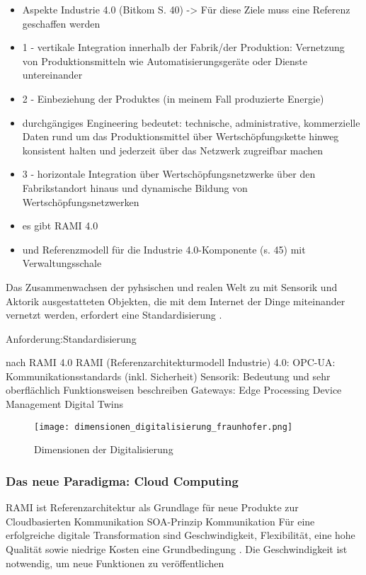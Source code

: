 \begin{itemize}
  \item Aspekte Industrie 4.0 (Bitkom S. 40) -> Für diese Ziele muss eine Referenz geschaffen werden
  \item 1 - vertikale Integration innerhalb der Fabrik/der Produktion: Vernetzung von Produktionsmitteln wie Automatisierungsgeräte oder Dienste untereinander
  \item 2 - Einbeziehung der Produktes (in meinem Fall produzierte Energie)
  \item durchgängiges Engineering bedeutet: technische, administrative, kommerzielle Daten rund um das Produktionsmittel über Wertschöpfungskette hinweg konsistent halten und jederzeit über das Netzwerk zugreifbar machen
  \item 3 - horizontale Integration über Wertschöpfungsnetzwerke über den Fabrikstandort hinaus und dynamische Bildung von Wertschöpfungsnetzwerken
  \item es gibt RAMI 4.0
  \item und Referenzmodell für die Industrie 4.0-Komponente (s. 45) mit Verwaltungsschale
\end{itemize}



Das Zusammenwachsen der pyhsischen und realen Welt zu mit Sensorik und Aktorik ausgestatteten Objekten, die mit dem Internet der Dinge miteinander vernetzt werden, erfordert eine Standardisierung \citep{BITKOM2015}.



Anforderung:Standardisierung


nach RAMI 4.0
RAMI (Referenzarchitekturmodell Industrie) 4.0: OPC-UA: Kommunikationsstandards (inkl. Sicherheit)
Sensorik: Bedeutung und sehr oberflächlich Funktionsweisen beschreiben
Gateways: Edge Processing
Device Management
Digital Twins

\begin{figure}[h]
  \texttt{[image: dimensionen\_digitalisierung\_fraunhofer.png]}
  \caption[Dimensionen der Digitalisierung]{Dimensionen der Digitalisierung \citep{FraunhoferISE}}
\end{figure}

\subsubsection{Das neue Paradigma: Cloud Computing}

RAMI ist Referenzarchitektur als Grundlage für neue Produkte zur Cloudbasierten Kommunikation
SOA-Prinzip Kommunikation
Für eine erfolgreiche digitale Transformation sind Geschwindigkeit, Flexibilität, eine hohe Qualität
sowie niedrige Kosten eine Grundbedingung \citep{Acharya2019}. Die Geschwindigkeit ist notwendig, um neue Funktionen zu veröffentlichen

